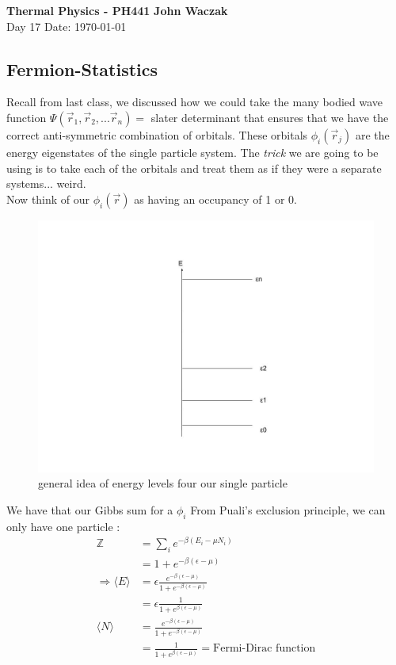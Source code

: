 \documentclass[a4paper, 11pt]{article}
\begin{document}
\noindent
\large\textbf{Thermal Physics - PH441} \hfill \textbf{John Waczak} \\
\normalsize Day 17 \hfill  Date: \today \\

\subsection*{Fermion-Statistics}
	Recall from last class, we discussed how we could take the many bodied wave function $\Psi(\vec{r}_1, \vec{r}_2, ...\vec{r}_n) = $ slater determinant that ensures that we have the correct anti-symmetric combination of orbitals. These orbitals $\phi_i(\vec{r}_j)$ are the energy eigenstates of the single particle system. The \textit{trick} we are going to be using is to take each of the orbitals and treat them as if they were a separate systems... weird. \\ 
	
	\noindent Now think of our $\phi_i(\vec{r})$ as having an occupancy of 1 or 0.\\
	
	
	\begin{figure}[!hbt]
		\centering 
		\includegraphics[width=0.6\columnwidth]{energyLevels}
		\caption{general idea of energy levels four our single particle} 
	\end{figure}
	
	
	 We have that our Gibbs sum for a $\phi_i$ From Puali's exclusion principle, we can only have one particle : 
		\begin{align*}
			\mathbb{Z} &= \sum_i e^{-\beta(E_i-\mu N_i)} \\ 
				&= 1 + e^{-\beta(\epsilon - \mu)} \\ 
			\Rightarrow \langle E \rangle &= \epsilon \frac{e^{-\beta(\epsilon-\mu)}}{1 + e^{-\beta(\epsilon - \mu)}} \\ 
			&= \epsilon\frac{1}{1+ e^{\beta(\epsilon - \mu)}} \\
			\langle N \rangle &=  \frac{e^{-\beta(\epsilon-\mu)}}{1 + e^{-\beta(\epsilon - \mu)}} \\
				&= \frac{1}{1+ e^{\beta(\epsilon - \mu)}}  = \text{Fermi-Dirac function} 
		\end{align*}
	
\end{document}
